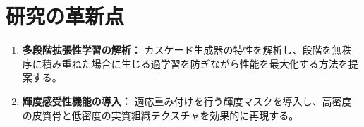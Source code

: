 \documentclass[twocolumn]{article}
\begin{document}
\section{研究の革新点}
\begin{enumerate}
	\item \textbf{多段階拡張性学習の解析：} カスケード生成器の特性を解析し、段階を無秩序に積み重ねた場合に生じる過学習を防ぎながら性能を最大化する方法を提案する。
	\item \textbf{輝度感受性機能の導入：} 適応重み付けを行う輝度マスクを導入し、高密度の皮質骨と低密度の実質組織テクスチャを効果的に再現する。
\end{enumerate}










\end{document}
